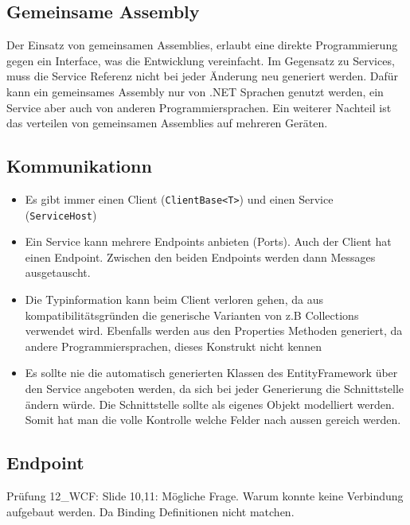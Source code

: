 \subsection{Gemeinsame Assembly}
Der Einsatz von gemeinsamen Assemblies, erlaubt eine direkte Programmierung gegen ein Interface, was die Entwicklung vereinfacht. Im Gegensatz zu Services, muss die Service Referenz nicht bei jeder Änderung neu generiert werden. Dafür kann ein gemeinsames Assembly nur von .NET Sprachen genutzt werden, ein Service aber auch von anderen Programmiersprachen. Ein weiterer Nachteil ist das verteilen von gemeinsamen Assemblies auf mehreren Geräten.

\subsection{Kommunikationn}
\begin{itemize}
	\item Es gibt immer einen Client (\lstinline|ClientBase<T>|) und einen Service (\lstinline|ServiceHost|)
	\item Ein Service kann mehrere Endpoints anbieten (Ports). Auch der Client hat einen Endpoint. Zwischen den beiden Endpoints werden dann Messages ausgetauscht. 
	\item Die Typinformation kann beim Client verloren gehen, da aus kompatibilitätsgründen die generische Varianten von z.B Collections verwendet wird. Ebenfalls werden aus den Properties Methoden generiert, da andere Programmiersprachen, dieses Konstrukt nicht kennen
	\item Es sollte nie die automatisch generierten Klassen des EntityFramework über den Service angeboten werden, da sich bei jeder Generierung die Schnittstelle ändern würde. Die Schnittstelle sollte als eigenes Objekt modelliert werden. Somit hat man die volle Kontrolle welche Felder nach aussen gereich werden. 
\end{itemize}


\clearpage

\subsection{Endpoint}
\begin{hint}{Prüfung}{}
12\_WCF: Slide 10,11: Mögliche Frage. Warum konnte keine Verbindung aufgebaut werden. Da Binding Definitionen nicht matchen.
\end{hint}

